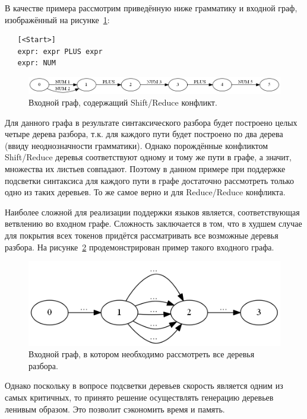 В качестве примера рассмотрим приведённую ниже грамматику и входной граф, изображённый на рисунке~\ref{shift_reduce_conflict}:

\begin{verbatim}
   [<Start>]
   expr: expr PLUS expr 
   expr: NUM
\end{verbatim}

\begin{figure}[t]
\centering
\includegraphics[width=\linewidth]{Ivanov/Pictures/conflict.png}
\caption{Входной граф, содержащий Shift/Reduce конфликт.}
\label{shift_reduce_conflict}
\end{figure}

Для данного графа в результате синтаксического разбора будет построено целых четыре дерева разбора, т.к. для каждого пути будет построено по два дерева (ввиду неоднозначности грамматики). Однако порождённые конфликтом Shift/Reduce деревья соответствуют одному и тому же пути в графе, а значит, множества их листьев совпадают. Поэтому в данном примере при поддержке подсветки синтаксиса для каждого пути в графе достаточно рассмотреть только одно из таких деревьев. То же самое верно и для Reduce/Reduce конфликта. 

Наиболее сложной для реализации поддержки языков является, соответствующая ветвлению во входном графе. Сложность заключается в том, что в худшем случае для покрытия всех токенов придётся рассматривать все возможные деревья разбора. На рисунке~\ref{bad_case} продемонстрирован пример такого входного графа. 

\begin{figure}[t]
\centering
\includegraphics[width=0.7\linewidth]{Ivanov/Pictures/bad_case.png}
\caption{Входной граф, в котором необходимо рассмотреть все деревья разбора.}
\label{bad_case}
\end{figure}

Однако поскольку в вопросе подсветки деревьев скорость является одним из самых критичных, то принято решение осуществлять генерацию деревьев ленивым образом. Это позволит сэкономить время и память. 

